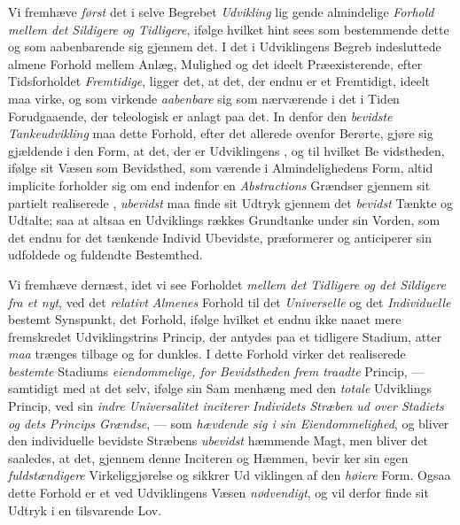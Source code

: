 Vi fremhæve \emph{først} det i selve Begrebet \emph{Udvikling} lig\-%
gende almindelige \emph{Forhold mellem det Sildigere og
Tidligere}, ifølge hvilket hint sees som bestemmende dette
og som aabenbarende sig gjennem det. I det i Udviklingens
Begreb indesluttede almene Forhold mellem Anlæg, Mulighed
og det ideelt Præexisterende, efter Tidsforholdet \emph{Fremtidige},
ligger det, at det, der endnu er et Fremtidigt, ideelt maa
virke, og som virkende \emph{aabenbare} sig som nærværende i det
i Tiden Forudgaaende, der teleologisk er anlagt paa det. In\-%
denfor den \emph{bevidste Tankeudvikling} maa dette Forhold,
efter det allerede ovenfor Berørte, gjøre sig gjældende i den
Form, at det, der er Udviklingens , og til hvilket Be\-%
vidstheden, ifølge sit Væsen som Bevidsthed, som værende i
Almindelighedens Form, altid implicite forholder sig om end
indenfor en \emph{Abstractions} Grændser gjennem sit partielt
realiserede , \emph{ubevidst} maa finde sit Udtryk gjennem det
\emph{bevidst} Tænkte og Udtalte; saa at altsaa en Udviklings\-%
rækkes Grundtanke under sin Vorden, som det endnu for det
tænkende Individ Ubevidste, præformerer og anticiperer sin
udfoldede og fuldendte Bestemthed.

Vi fremhæve dernæst, idet vi see Forholdet \emph{mellem det
Tidligere og det Sildigere fra et nyt}, ved det \emph{relativt
Almenes} Forhold til det \emph{Universelle} og det \emph{Individuelle}
bestemt Synspunkt, det Forhold, ifølge hvilket et endnu ikke
naaet mere fremskredet Udviklingstrins Princip, der antydes
paa et tidligere Stadium, atter \emph{maa} trænges tilbage og for\-%
dunkles. I dette Forhold virker det realiserede \emph{bestemte}
Stadiums \emph{eiendommelige, for Bevidstheden frem\-%
traadte} Princip, --- samtidigt med at det selv, ifølge sin Sam\-%
menhæng med den \emph{totale} Udviklings Princip, ved sin \emph{indre
 Universalitet inciterer Individets Stræben ud over
Stadiets og dets Princips Grændse}, --- som \emph{hævdende
sig i sin Eiendommelighed}, og bliver den individuelle
bevidste Stræbens \emph{ubevidst} hæmmende Magt, men bliver det
saaledes, at det, gjennem denne Inciteren og Hæmmen, bevir\-%
ker sin egen \emph{fuldstændigere} Virkeliggjørelse og sikkrer Ud\-%
viklingen af den \emph{høiere} Form. Ogsaa dette Forhold er et
ved Udviklingens Væsen \emph{nødvendigt}, og vil derfor finde sit
Udtryk i en tilsvarende Lov.

